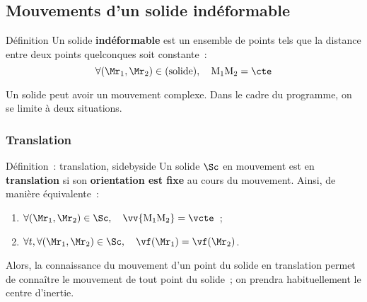 \documentclass[../main/main.tex]{subfiles}
\begin{document}
% 
% 

\subsection{Mouvements d'un solide indéformable}

\begin{tdefi}{Définition}
    Un solide \textbf{indéformable} est un ensemble de points tels que la
    distance entre deux points quelconques soit constante~:
    \[\forall (\Mr_1,\Mr_2) \in ({\rm solide}), \quad {\rm M_1M_2} = \cte\]
\end{tdefi} 

Un solide peut avoir un mouvement complexe. Dans le cadre du programme, on se
limite à deux situations.

\subsubsection{Translation}
\begin{tdefi}{Définition~: translation, sidebyside}
    Un solide $\Sc$ en mouvement est en \textbf{translation} si son
    \textbf{orientation est fixe} au cours du mouvement. Ainsi, de manière
    équivalente~:
    \begin{enumerate}
        \item $\forall (\Mr_1,\Mr_2) \in \Sc, \quad \vv{\rm M_1M_2} =
            \vcte$~;
        \item $\forall t, \forall (\Mr_1,\Mr_2) \in \Sc, \quad
            \vf(\Mr_1) = \vf(\Mr_2)$.
    \end{enumerate}
    \tcblower
    Alors, la connaissance du mouvement d'un point du solide en translation
    permet de connaître le mouvement de tout point du solide~; on prendra
    habituellement le centre d'inertie.
\end{tdefi}
\end{document}
